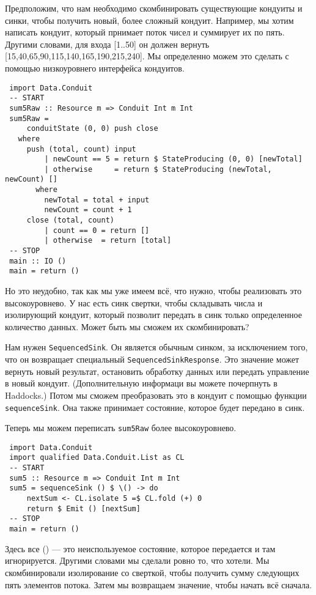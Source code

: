 Предположим, что нам необходимо скомбинировать существующие кондуиты  и  синки, 
чтобы получить новый, более сложный кондуит. Например, мы хотим написать кондуит, 
который прнимает поток чисел и суммирует их по пять. Другими словами, для входа 
[1..50] он должен вернуть [15,40,65,90,115,140,165,190,215,240]. Мы определенно 
можем это сделать с помощью низкоуровнего интерфейса кондуитов.
\begin{lstlisting}
 import Data.Conduit
 -- START
 sum5Raw :: Resource m => Conduit Int m Int
 sum5Raw =
     conduitState (0, 0) push close
   where
     push (total, count) input
         | newCount == 5 = return $ StateProducing (0, 0) [newTotal]
         | otherwise     = return $ StateProducing (newTotal, newCount) []
       where
         newTotal = total + input
         newCount = count + 1
     close (total, count)
         | count == 0 = return []
         | otherwise  = return [total]
 -- STOP
 main :: IO ()
 main = return ()
\end{lstlisting}
Но это неудобно, так как мы уже имеем всё, что нужно, чтобы реализовать это 
высокоуровнево. У нас есть синк свертки, чтобы складывать числа и изолирующий 
кондуит, который позволит передать в синк только определенное количество данных. 
Может быть мы сможем их скомбинировать?
 
Нам нужен \lstinline'SequencedSink'. Он является обычным синком, за исключением 
того, что он возвращает специальный \lstinline'SequencedSinkResponse'. Это 
значение может вернуть новый результат, остановить обработку данных или передать 
управление в новый кондуит. (Дополнительную информаци вы можете почерпнуть 
в Haddocks.) Потом мы сможем преобразовать это в кондуит с помощью функции 
\lstinline'sequenceSink'. Она также принимает состояние, которое будет 
передано в синк.
 
Теперь мы можем переписать \lstinline'sum5Raw' более высокоуровнево.
\begin{lstlisting}
 import Data.Conduit
 import qualified Data.Conduit.List as CL
 -- START
 sum5 :: Resource m => Conduit Int m Int
 sum5 = sequenceSink () $ \() -> do
     nextSum <- CL.isolate 5 =$ CL.fold (+) 0
     return $ Emit () [nextSum]
 -- STOP
 main = return ()
\end{lstlisting}
Здесь все () --- это  неиспользуемое состояние, которое передается и там 
игнорируется. Другими словами мы сделали ровно то, что хотели. Мы скомбинировали 
изолирование со сверткой, чтобы получить сумму следующих пять элементов потока. 
Затем мы возвращаем значение, чтобы начать всё сначала.
 
